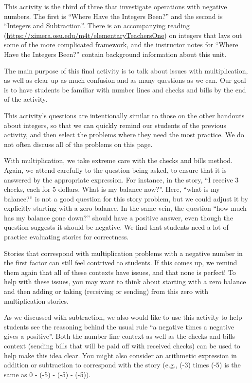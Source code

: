 \documentclass{ximera}
\begin{document}
\newpage
\begin{instructorNotes}
This activity is the third of three that investigate operations with negative numbers.  The first is ``Where Have the Integers Been?'' and the second is ``Integers and Subtraction''.  There is an accompanying reading (\url{https://ximera.osu.edu/m4t/elementaryTeachersOne}) on integers that lays out some of the more complicated framework, and the instructor notes for ``Where Have the Integers Been?'' contain background information about this unit.

The main purpose of this final activity is to talk about issues with multiplication, as well as clear up as much confusion and as many questions as we can.  Our goal is to have students be familiar with number lines and checks and bills by the end of the activity.

This activity's questions are intentionally similar to those on the other handouts about integers, so that we can quickly remind our students of the previous activity, and then select the problems where they need the most practice.  We do not often discuss all of the problems on this page.

With multiplication, we take extreme care with the checks and bills method.  Again, we attend carefully to the question being asked, to ensure that it is answered by the appropriate expression.  For instance, in the story, ``I receive 3 checks, each for 5 dollars.  What is my balance now?''.  Here, ``what is my balance?'' is not a good question for this story problem, but we could adjust it by explicitly starting with a zero balance.  In the same vein, the question ``how much has my balance gone down?'' should have a positive answer, even though the question suggests it should be negative.  We find that students need a lot of practice evaluating stories for correctness.

Stories that correspond with multiplication problems with a negative number in the first factor can still feel contrived to students.  If this comes up, we remind them again that all of these contexts have issues, and that none is perfect!  To help with these issues, you may want to think about starting with a zero balance and then adding or taking (receiving or sending) from this zero with multiplication stories.  

As we discussed with subtraction, we also would like to use this activity to help students see the reasoning behind the usual rule ``a negative times a negative gives a positive''.  Both the number line context as well as the checks and bills context (sending bills that will be paid off with received checks) can be used to help make this idea clear.  You might also consider an arithmetic expression in addition or subtraction to correspond with the story (e.g., (-3) times (-5) is the same as 0 - (-5) - (-5) - (-5)).


\end{instructorNotes}
\end{document}
